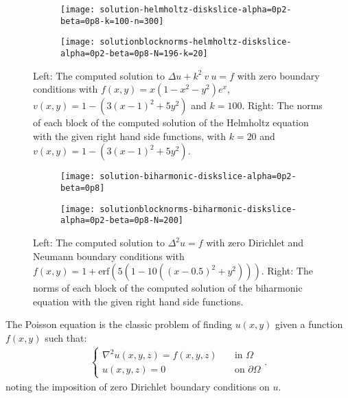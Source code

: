 \documentclass[11pt, oneside]{article}   	%
\begin{document}
\begin{figure}[t]
	\begin{subfigure}{0.3\textwidth}
	\centering
	\texttt{[image: solution-helmholtz-diskslice-alpha=0p2-beta=0p8-k=100-n=300]}
	\end{subfigure}
	\begin{subfigure}{0.5\textwidth}
	\texttt{[image: solutionblocknorms-helmholtz-diskslice-alpha=0p2-beta=0p8-N=196-k=20]}
	\centering
	\end{subfigure}
	\caption{Left: The computed solution to $\Delta u + k^2 \: v \: u = f$ with zero boundary conditions with $f(x,y) = x(1-x^2-y^2)e^x$, $v(x,y) = 1 - (3(x-1)^2 + 5y^2)$ and $k = 100$. Right: The norms of each block of the computed solution of the Helmholtz equation with the given right hand side functions, with $k=20$ and $v(x,y) = 1 - (3(x-1)^2 + 5y^2)$.}
	\centering
	\label{fig:helmholtz}
\end{figure}

\begin{figure}[t]
	\begin{subfigure}{0.3\textwidth}
	\centering
	\texttt{[image: solution-biharmonic-diskslice-alpha=0p2-beta=0p8]}
	\end{subfigure}
	\begin{subfigure}{0.5\textwidth}
	\texttt{[image: solutionblocknorms-biharmonic-diskslice-alpha=0p2-beta=0p8-N=200]}
	\centering
	\end{subfigure}
	\caption{Left: The computed solution to $\Delta^2 u = f$ with zero Dirichlet and Neumann boundary conditions with $f(x,y) = 1 + \text{erf}(5(1 - 10((x - 0.5)^2 + y^2)))$. Right: The norms of each block of the computed solution of the biharmonic equation with the given right hand side functions.}
	\centering
	\label{fig:biharmonic}
\end{figure}

The Poisson equation is the classic problem of finding \(u(x,y)\) given a function \(f(x,y)\) such that:
\begin{align}
	\begin{cases}
    		\nabla^2 u(x,y,z) = f(x,y,z) &\quad \text{in } \Omega \\
		u(x,y,z) = 0& \quad \text{on } \partial \Omega
	\end{cases}.
	\label{eqn:poisson}
\end{align}
noting the imposition of zero Dirichlet boundary conditions on $u$.
\end{document}

